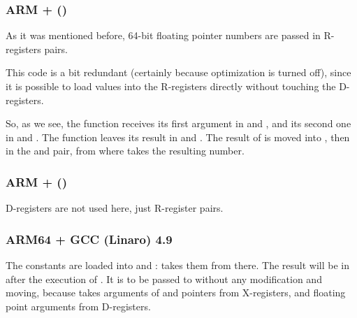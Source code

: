 \subsubsection{ARM + \NonOptimizingXcodeIV (\ThumbTwoMode)}
\label{FPU_passing_floats_ARM}



As it was mentioned before, 64-bit floating pointer numbers are passed in R-registers pairs.

This code is a bit redundant (certainly because optimization is turned off), 
since it is possible to load values into the R-registers directly without touching the D-registers.

So, as we see, the  function receives its first argument in  and , and its second one in  and . 
The function leaves its result in  and .
The result of  is moved into , then in the  and  pair, from where \printf takes the resulting number.

\subsubsection{ARM + \NonOptimizingKeilVI (\ARMMode)}



D-registers are not used here, just R-register pairs.

\subsubsection{ARM64 + \Optimizing GCC (Linaro) 4.9}



The constants are loaded into  and :  takes them from there.
The result will be in  after the execution of .
It is to be passed to \printf without any modification and moving, 
because \printf takes arguments of  
and pointers from X-registers, and floating point arguments from D-registers.

